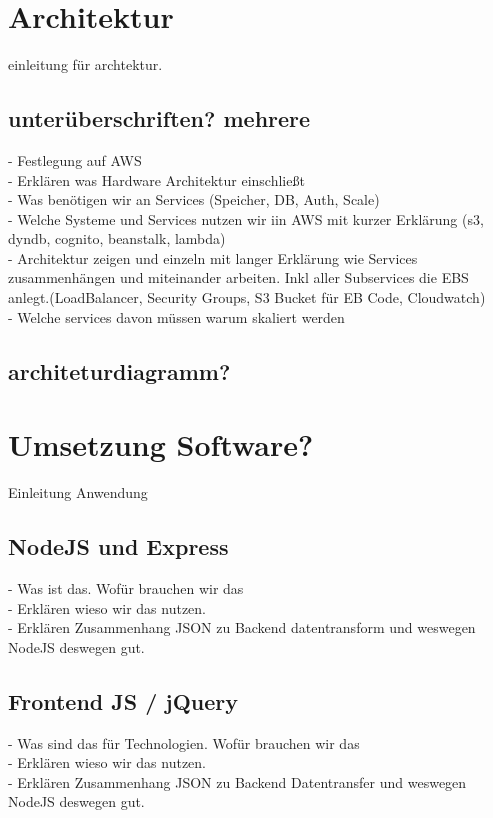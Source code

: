 \documentclass[a4paper, 12pt]{scrreprt}
\begin{document}
\chapter{Architektur}
einleitung für archtektur.

\section{unterüberschriften? mehrere}
- Festlegung auf AWS\\
- Erklären was Hardware Architektur einschließt\\
- Was benötigen wir an Services (Speicher, DB, Auth, Scale)\\
- Welche Systeme und Services nutzen wir iin AWS mit kurzer Erklärung (s3, dyndb, cognito, beanstalk, lambda)\\
- Architektur zeigen und einzeln mit langer Erklärung wie Services zusammenhängen und miteinander arbeiten. Inkl aller Subservices die EBS anlegt.(LoadBalancer, Security Groups, S3 Bucket für EB Code, Cloudwatch)\\
- Welche services davon müssen warum skaliert werden

\section{architeturdiagramm?}

\chapter{Umsetzung Software?}
Einleitung Anwendung

\section{NodeJS und Express}
- Was ist das. Wofür brauchen wir das\\
- Erklären wieso wir das nutzen.\\
- Erklären Zusammenhang JSON zu Backend datentransform und weswegen NodeJS deswegen gut.

\section{Frontend JS / jQuery}
- Was sind das für Technologien. Wofür brauchen wir das\\
- Erklären wieso wir das nutzen. \\
- Erklären Zusammenhang JSON zu Backend Datentransfer und weswegen NodeJS deswegen gut.
\end{document}
